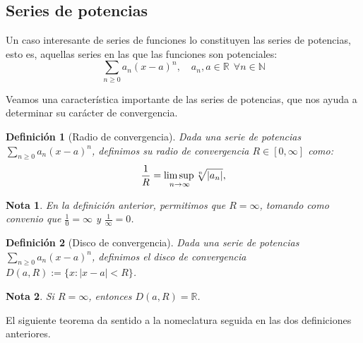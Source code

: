 \documentclass[11pt, a4paper]{article}
\theoremstyle{theorem-style}
\theoremstyle{definition-style}
\newtheorem*{ndef}{Definición}
\theoremstyle{remark-style}
\newtheorem*{nota}{Nota}
\theoremstyle{example-style}
\begin{document}
\subsection{Series de potencias}

Un caso interesante de series de funciones lo constituyen las series de potencias, esto es, aquellas series en las que las funciones son potenciales: $$\sum_{n \ge 0} a_n(x-a)^n, \quad a_n, a \in \mathbb{R} \ \ \forall n \in \mathbb{N}$$

Veamos una característica importante de las series de potencias, que nos ayuda a determinar su carácter de convergencia.

\begin{ndef}[Radio de convergencia] Dada una serie de potencias $\sum_{n \ge 0} a_n(x-a)^n$, definimos su radio de convergencia $R \in [0, \infty]$ como: $$
\frac{1}{R} =\underset{n\to\infty}{\mbox{lim\,sup\,}}  \sqrt[n]{|a_n|},$$
\end{ndef}

\begin{nota}
	En la definición anterior, permitimos que $R = \infty$, tomando como convenio que $\frac{1}{0} = \infty$ y $\frac{1}{\infty} = 0$.
\end{nota}

\begin{ndef}[Disco de convergencia] Dada una serie de potencias $\sum_{n \ge 0} a_n(x-a)^n$, definimos el disco de convergencia $D(a,R) := \{ x : |x-a| < R\}$. 
\end{ndef}

\begin{nota}
	Si $R = \infty$, entonces $D(a,R) = \mathbb{R}$.
\end{nota}

El siguiente teorema da sentido a la nomeclatura seguida en las dos definiciones anteriores.
\end{document}
